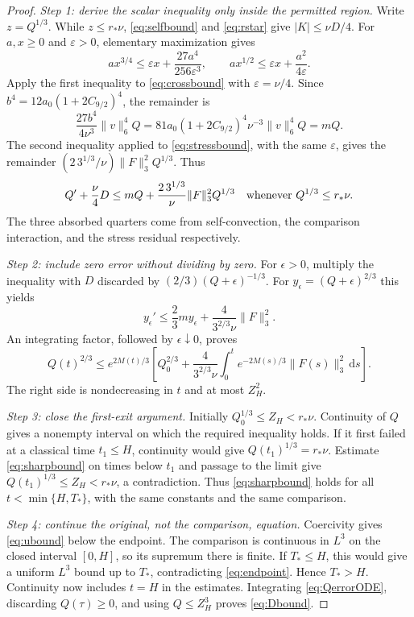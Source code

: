 \documentclass[11pt,a4paper]{article}
\theoremstyle{definition}\newtheorem{definition}[theorem]{Definition}
\theoremstyle{remark}\newtheorem{remark}[theorem]{Remark}
\newcommand{\dd}{\,\mathrm d}
\newcommand{\norm}[1]{\lVert #1\rVert}
\newcommand{\rstar}{r_*}
\numberwithin{equation}{section}
\begin{document}
\begin{proof}
\emph{Step 1: derive the scalar inequality only inside the permitted region.}
Write $z=Q^{1/3}$. While $z\le\rstar\nu$, \eqref{eq:selfbound} and \eqref{eq:rstar} give $|K|\le\nu D/4$.
For $a,x\ge0$ and $\varepsilon>0$, elementary maximization gives
\begin{equation}\label{eq:young}
 ax^{3/4}\le\varepsilon x+\frac{27a^4}{256\varepsilon^3},
 \qquad ax^{1/2}\le\varepsilon x+\frac{a^2}{4\varepsilon}.
\end{equation}
Apply the first inequality to \eqref{eq:crossbound} with $\varepsilon=\nu/4$. Since
$b^4=12a_0(1+2C_{9/2})^4$, the remainder is
\[
 \frac{27b^4}{4\nu^3}\norm v_6^4Q
 =81a_0(1+2C_{9/2})^4\nu^{-3}\norm v_6^4Q=mQ.
\]
The second inequality applied to \eqref{eq:stressbound}, with the same $\varepsilon$, gives the remainder $(2\,3^{1/3}/\nu)\norm F_3^2Q^{1/3}$. Thus
\begin{equation}\label{eq:QerrorODE}
 Q'+\frac\nu4D\le mQ+\frac{2\,3^{1/3}}\nu\norm F_3^2Q^{1/3}
 \quad\hbox{whenever }Q^{1/3}\le\rstar\nu.
\end{equation}
The three absorbed quarters come from self-convection, the comparison interaction, and the stress residual respectively.

\emph{Step 2: include zero error without dividing by zero.}
For $\epsilon>0$, multiply the inequality with $D$ discarded by $(2/3)(Q+\epsilon)^{-1/3}$. For $y_\epsilon=(Q+\epsilon)^{2/3}$ this yields
\[
 y_\epsilon'\le\frac23m y_\epsilon+\frac4{3^{2/3}\nu}\norm F_3^2.
\]
An integrating factor, followed by $\epsilon\downarrow0$, proves
\begin{equation}\label{eq:sharpbound}
 Q(t)^{2/3}\le e^{2M(t)/3}\left[
 Q_0^{2/3}+\frac4{3^{2/3}\nu}
 \int_0^t e^{-2M(s)/3}\norm{F(s)}_3^2\dd s\right].
\end{equation}
The right side is nondecreasing in $t$ and at most $Z_H^2$.

\emph{Step 3: close the first-exit argument.}
Initially $Q_0^{1/3}\le Z_H<\rstar\nu$. Continuity of $Q$ gives a nonempty interval on which the required inequality holds. If it first failed at a classical time $t_1\le H$, continuity would give $Q(t_1)^{1/3}=\rstar\nu$. Estimate \eqref{eq:sharpbound} on times below $t_1$ and passage to the limit give $Q(t_1)^{1/3}\le Z_H<\rstar\nu$, a contradiction. Thus \eqref{eq:sharpbound} holds for all $t<\min\{H,T_*\}$, with the same constants and the same comparison.

\emph{Step 4: continue the original, not the comparison, equation.}
Coercivity gives \eqref{eq:ubound} below the endpoint. The comparison is continuous in $L^3$ on the closed interval $[0,H]$, so its supremum there is finite. If $T_*\le H$, this would give a uniform $L^3$ bound up to $T_*$, contradicting \eqref{eq:endpoint}. Hence $T_*>H$. Continuity now includes $t=H$ in the estimates. Integrating \eqref{eq:QerrorODE}, discarding $Q(\tau)\ge0$, and using $Q\le Z_H^3$ proves \eqref{eq:Dbound}.
\end{proof}
\end{document}
